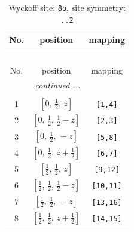 \documentclass[fleqn,8pt]{jsarticle}
\begin{document}
\begin{longtable}{ccc}
\caption{Wyckoff site: {\tt 8o}, site symmetry: {\tt ..2}}
 \\
 \hline \hline
No. & position & mapping \\ \hline \endfirsthead

\multicolumn{2}{l}{\tablename\ \thetable{}} \\
 \hline \hline
No. & position & mapping \\ \hline \endhead

 \hline \hline
\multicolumn{2}{r}{\footnotesize\it continued ...} \\ \endfoot

 \hline \hline
\multicolumn{2}{r}{} \\ \endlastfoot

1 & $\left[ 0,\, \frac{1}{2},\, z \right]$ & {\tt [1,4]} \\ \hline
2 & $\left[ 0,\, \frac{1}{2},\, \frac{1}{2} - z \right]$ & {\tt [2,3]} \\ \hline
3 & $\left[ 0,\, \frac{1}{2},\, - z \right]$ & {\tt [5,8]} \\ \hline
4 & $\left[ 0,\, \frac{1}{2},\, z + \frac{1}{2} \right]$ & {\tt [6,7]} \\ \hline
5 & $\left[ \frac{1}{2},\, \frac{1}{2},\, z \right]$ & {\tt [9,12]} \\ \hline
6 & $\left[ \frac{1}{2},\, \frac{1}{2},\, \frac{1}{2} - z \right]$ & {\tt [10,11]} \\ \hline
7 & $\left[ \frac{1}{2},\, \frac{1}{2},\, - z \right]$ & {\tt [13,16]} \\ \hline
8 & $\left[ \frac{1}{2},\, \frac{1}{2},\, z + \frac{1}{2} \right]$ & {\tt [14,15]} \\
\end{longtable}
\renewcommand{\arraystretch}{1.2}
\end{document}
